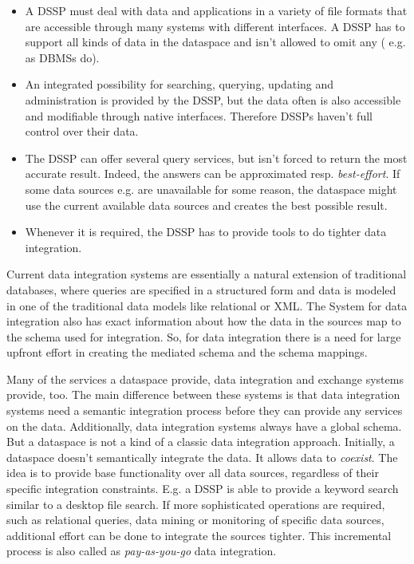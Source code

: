 \begin{itemize}
\item A DSSP must deal with data and applications in a variety of file formats that are accessible through many systems with different interfaces. A DSSP has to support all kinds of data in the dataspace and isn't allowed to omit any ( e.g. as DBMSs do).

\item An integrated possibility for searching, querying, updating and administration is provided by the DSSP, but the data often is also accessible and modifiable through native interfaces. Therefore DSSPs haven't full control over their data.

\item The DSSP can offer several query services, but isn't forced to return the most accurate result. Indeed,  the answers can be approximated resp. \emph{best-effort}. If some data sources e.g. are unavailable for some reason, the dataspace might use the current available data sources and creates the best possible result.

\item Whenever it is required, the DSSP has to provide tools to do tighter data integration.
\end{itemize}

Current data integration systems are essentially a natural extension of traditional databases, where queries are specified in a structured form and data is modeled in one of the traditional data models like relational or XML. The System for data integration also has exact information about how the data in the sources map to the schema used for integration. So, for data integration there is a need for large upfront effort in creating the mediated schema and the schema mappings.

Many of the services a dataspace provide, data integration and exchange systems provide, too. The main difference between these systems is that data integration systems need a semantic integration process before they can provide any services on the data. Additionally, data integration systems always have a global schema. But a dataspace is not a kind of a classic data integration approach. Initially, a dataspace doesn't semantically integrate the data. It allows data to \emph{coexist}.  The idea is to provide base functionality over all data sources, regardless of their specific integration constraints. E.g. a DSSP is able to provide a keyword search similar to a desktop file search. If more sophisticated operations are required, such as relational queries, data mining or monitoring of specific data sources, additional effort can be done to integrate the sources tighter. This incremental process is also called as \emph{pay-as-you-go} data integration.


